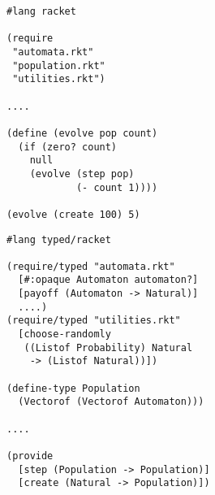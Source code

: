 \begin{minipage}[t]{0.5\textwidth}
\flushleft
\begin{verbatim}
#lang racket

(require
 "automata.rkt"
 "population.rkt"
 "utilities.rkt")

....

(define (evolve pop count)
  (if (zero? count)
    null
    (evolve (step pop)
            (- count 1))))

(evolve (create 100) 5)
\end{verbatim}
\end{minipage}%
\hspace{0.4cm}%
\begin{minipage}[t]{0.4\textwidth}
  \flushleft
  \begin{verbatim}
#lang typed/racket

(require/typed "automata.rkt"
  [#:opaque Automaton automaton?]
  [payoff (Automaton -> Natural)]
  ....)
(require/typed "utilities.rkt"
  [choose-randomly
   ((Listof Probability) Natural
    -> (Listof Natural))])

(define-type Population
  (Vectorof (Vectorof Automaton)))

....

(provide
  [step (Population -> Population)]
  [create (Natural -> Population)])
\end{verbatim}
\end{minipage}
